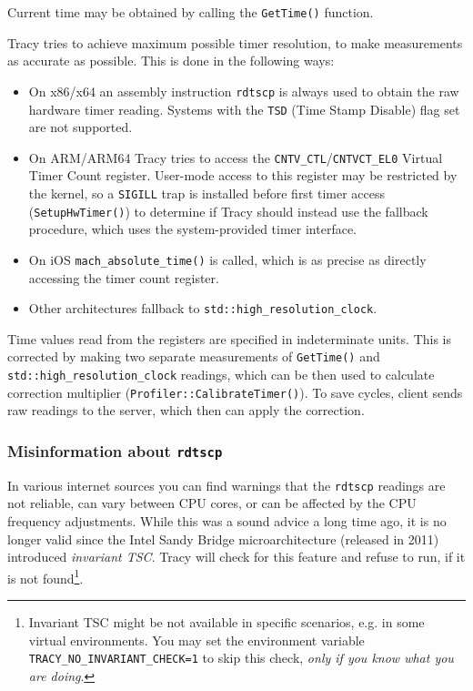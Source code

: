 \documentclass[hidelinks,titlepage,a4paper]{article}
\begin{document}
Current time may be obtained by calling the \texttt{GetTime()} function.

Tracy tries to achieve maximum possible timer resolution, to make measurements as accurate as possible. This is done in the following ways:

\begin{itemize}
\item On x86/x64 an assembly instruction \texttt{rdtscp} is always used to obtain the raw hardware timer reading. Systems with the \texttt{TSD} (Time Stamp Disable) flag set are not supported.
\item On ARM/ARM64 Tracy tries to access the \texttt{CNTV\_CTL}/\texttt{CNTVCT\_EL0} Virtual Timer Count register. User-mode access to this register may be restricted by the kernel, so a \texttt{SIGILL} trap is installed before first timer access (\texttt{SetupHwTimer()}) to determine if Tracy should instead use the fallback procedure, which uses the system-provided timer interface.
\item On iOS \texttt{mach\_absolute\_time()} is called, which is as precise as directly accessing the timer count register.
\item Other architectures fallback to \texttt{std::high\_resolution\_clock}.
\end{itemize}

Time values read from the registers are specified in indeterminate units. This is corrected by making two separate measurements of \texttt{GetTime()} and \texttt{std::high\_resolution\_clock} readings, which can be then used to calculate correction multiplier (\texttt{Profiler::CalibrateTimer()}). To save cycles, client sends raw readings to the server, which then can apply the correction.

\subsubsection{Misinformation about \texttt{rdtscp}}

In various internet sources you can find warnings that the \texttt{rdtscp} readings are not reliable, can vary between CPU cores, or can be affected by the CPU frequency adjustments. While this was a sound advice a long time ago, it is no longer valid since the Intel Sandy Bridge microarchitecture (released in 2011) introduced \emph{invariant TSC}. Tracy will check for this feature and refuse to run, if it is not found\footnote{Invariant TSC might be not available in specific scenarios, e.g. in some virtual environments. You may set the environment variable \texttt{TRACY\_NO\_INVARIANT\_CHECK=1} to skip this check, \emph{only if you know what you are doing}.}.
\end{document}
